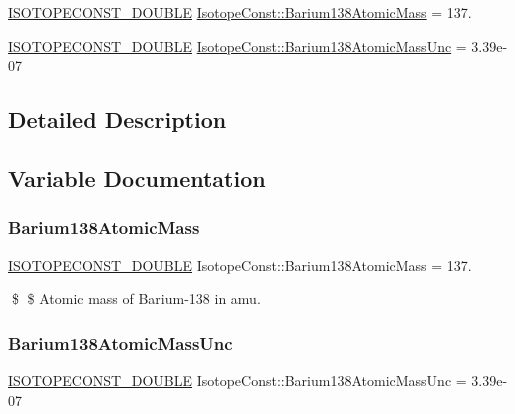 \begin{DoxyCompactItemize}
\item 
\mbox{\hyperlink{group___isotope_const-_macros_ga8f45a7272ce02c0b4c65c44636ed719a}{I\+S\+O\+T\+O\+P\+E\+C\+O\+N\+S\+T\+\_\+\+D\+O\+U\+B\+LE}} \mbox{\hyperlink{group___isotope_const-_barium-_ba138_ga1fe4f3cc2c401b39d8d1c4acf56d1544}{Isotope\+Const\+::\+Barium138\+Atomic\+Mass}} = 137.
\item 
\mbox{\hyperlink{group___isotope_const-_macros_ga8f45a7272ce02c0b4c65c44636ed719a}{I\+S\+O\+T\+O\+P\+E\+C\+O\+N\+S\+T\+\_\+\+D\+O\+U\+B\+LE}} \mbox{\hyperlink{group___isotope_const-_barium-_ba138_ga6eddd4612dc1241be347d6aa0e51e12b}{Isotope\+Const\+::\+Barium138\+Atomic\+Mass\+Unc}} = 3.\+39e-\/07
\end{DoxyCompactItemize}


\subsection{Detailed Description}


\subsection{Variable Documentation}
\mbox{\label{group___isotope_const-_barium-_ba138_ga1fe4f3cc2c401b39d8d1c4acf56d1544}} 
\subsubsection{\texorpdfstring{Barium138\+Atomic\+Mass}{Barium138AtomicMass}}
{\footnotesize\ttfamily \mbox{\hyperlink{group___isotope_const-_macros_ga8f45a7272ce02c0b4c65c44636ed719a}{I\+S\+O\+T\+O\+P\+E\+C\+O\+N\+S\+T\+\_\+\+D\+O\+U\+B\+LE}} Isotope\+Const\+::\+Barium138\+Atomic\+Mass = 137.}

\$ \$ Atomic mass of Barium-\/138 in amu. \mbox{\label{group___isotope_const-_barium-_ba138_ga6eddd4612dc1241be347d6aa0e51e12b}} 
\subsubsection{\texorpdfstring{Barium138\+Atomic\+Mass\+Unc}{Barium138AtomicMassUnc}}
{\footnotesize\ttfamily \mbox{\hyperlink{group___isotope_const-_macros_ga8f45a7272ce02c0b4c65c44636ed719a}{I\+S\+O\+T\+O\+P\+E\+C\+O\+N\+S\+T\+\_\+\+D\+O\+U\+B\+LE}} Isotope\+Const\+::\+Barium138\+Atomic\+Mass\+Unc = 3.\+39e-\/07}

